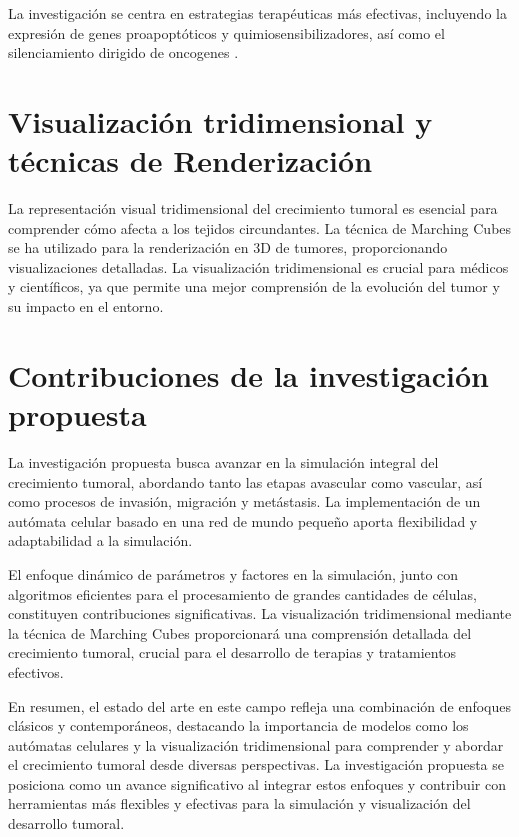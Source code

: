 La investigación se centra en estrategias terapéuticas más efectivas, incluyendo la expresión de genes proapopt\'oticos y quimiosensibilizadores, así como el silenciamiento dirigido de oncogenes \cite{seke2021}.

\section{Visualización tridimensional y técnicas de Renderización}

La representación visual tridimensional del crecimiento tumoral es esencial para comprender cómo afecta a los tejidos circundantes. La técnica de Marching Cubes \cite{lorensen1987} se ha utilizado para la renderización en 3D de tumores, proporcionando visualizaciones detalladas. La visualización tridimensional es crucial para médicos y científicos, ya que permite una mejor comprensión de la evolución del tumor y su impacto en el entorno.

\section{Contribuciones de la investigación propuesta}

La investigación propuesta busca avanzar en la simulación integral del crecimiento tumoral, abordando tanto las etapas avascular como vascular, así como procesos de invasión, migración y metástasis. La implementación de un autómata celular basado en una red de mundo pequeño \cite{watts} aporta flexibilidad y adaptabilidad a la simulación.

El enfoque dinámico de parámetros y factores en la simulación, junto con algoritmos eficientes para el procesamiento de grandes cantidades de células, constituyen contribuciones significativas. La visualización tridimensional mediante la técnica de Marching Cubes proporcionará una comprensión detallada del crecimiento tumoral, crucial para el desarrollo de terapias y tratamientos efectivos.

En resumen, el estado del arte en este campo refleja una combinación de enfoques clásicos y contemporáneos, destacando la importancia de modelos como los autómatas celulares y la visualización tridimensional para comprender y abordar el crecimiento tumoral desde diversas perspectivas. La investigación propuesta se posiciona como un avance significativo al integrar estos enfoques y contribuir con herramientas más flexibles y efectivas para la simulación y visualización del desarrollo tumoral.